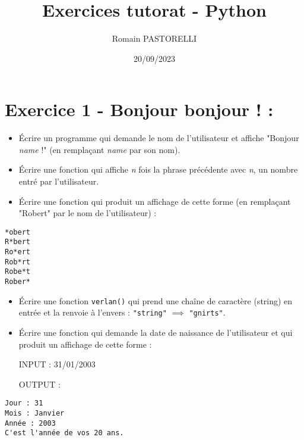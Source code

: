 \documentclass[11pt]{article}
\author{Romain PASTORELLI}
\date{20/09/2023}
\title{Exercices tutorat - Python}
\begin{document}
\maketitle

\section{Exercice 1 - Bonjour bonjour ! :}
\label{sec:orgc0c72d0}
\begin{itemize}
\item Écrire un programme qui demande le nom de l'utilisateur et affiche "Bonjour \emph{name} !" (en remplaçant \emph{name} par son nom).
\item Écrire une fonction qui affiche \emph{n} fois la phrase précédente avec \emph{n}, un nombre entré par l'utilisateur.
\item Écrire une fonction qui produit un affichage de cette forme (en remplaçant "Robert" par le nom de l'utilisateur) :
\end{itemize}
\begin{verbatim}
*obert
R*bert
Ro*ert
Rob*rt
Robe*t
Rober*
\end{verbatim}
\begin{itemize}
\item Écrire une fonction \texttt{verlan()} qui prend une chaîne de caractère (string) en entrée et la renvoie à l'envers : \texttt{"string"} \(\implies\) \texttt{"gnirts"}.
\item Écrire une fonction qui demande la date de naissance de l'utilisateur et qui produit un affichage de cette forme :

INPUT : 31/01/2003

OUTPUT :
\end{itemize}

\begin{verbatim}
Jour : 31
Mois : Janvier
Année : 2003
C'est l'année de vos 20 ans.
\end{verbatim}
\end{document}
